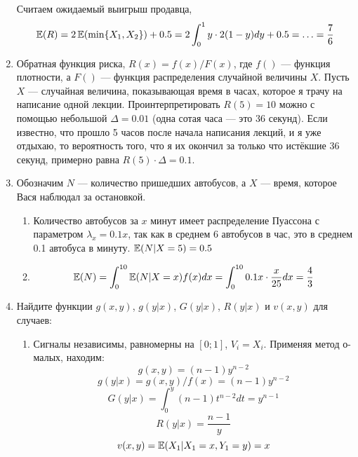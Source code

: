 \begin{enumerate}
Считаем ожидаемый выигрыш продавца,
\begin{equation}
\operatorname{\mathbb{E}}(R)=2\operatorname{\mathbb{E}}(\min\{X_{1},X_{2}\})+0.5=2\int_{0}^{1}y\cdot 2(1-y)dy+0.5=\ldots=\frac{7}{6}
\end{equation}


\item Обратная функция риска, $ R(x)=f(x)/F(x) $, где $ f() $ — функция плотности, а $ F() $ — функция распределения случайной величины $ X $. Пусть $ X $ — случайная величина, показывающая время в часах, которое я трачу на написание одной лекции. Проинтерпретировать $ R(5)=10 $ можно с помощью небольшой $ \Delta=0.01 $ (одна сотая часа — это 36 секунд). Если известно, что прошло 5 часов после начала написания лекций, и я уже отдыхаю, то вероятность того, что я их окончил за только что истёкшие 36 секунд, примерно равна $ R(5)\cdot \Delta=0.1 $.
\item Обозначим $ N$ — количество пришедших автобусов, а $ X $ — время, которое Вася наблюдал за остановкой.
\begin{enumerate}
\item Количество автобусов за $ x $ минут имеет распределение Пуассона с параметром $ \lambda_{x}=0.1x $, так как в среднем 6 автобусов в час, это в среднем 0.1 автобуса в минуту. $ \operatorname{\mathbb{E}}(N|X=5)=0.5 $
\item \begin{equation} \operatorname{\mathbb{E}}(N)=\int_{0}^{10}\operatorname{\mathbb{E}}(N|X=x)f(x)dx=\int_{0}^{10}0.1x\cdot \frac{x}{25} dx=\frac{4}{3} \end{equation}
\end{enumerate}
\item Найдите функции $ g(x,y)$, $ g(y|x)$, $ G(y|x)$,  $R(y|x)$ и $v(x,y)$ для случаев:
\begin{enumerate}
\item Сигналы независимы, равномерны на $ [0;1] $, $ V_{i}=X_{i} $.
Применяя метод о-малых, находим:
\begin{equation}
g(x,y)=(n-1)y^{n-2}
\end{equation}
\begin{equation}
g(y|x)=g(x,y)/f(x)=(n-1)y^{n-2}
\end{equation}
\begin{equation}
G(y|x)=\int_{0}^{y}(n-1)t^{n-2}dt=y^{n-1}
\end{equation}
\begin{equation}
R(y|x)=\frac{n-1}{y}
\end{equation}
\begin{equation}
v(x,y)=\operatorname{\mathbb{E}}(X_{1}|X_{1}=x,Y_{1}=y)=x
\end{equation}


\end{enumerate}
\end{enumerate}
